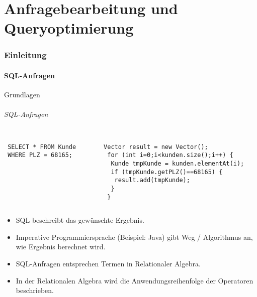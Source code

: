 \part{Anfragebearbeitung und Queryoptimierung}

\section{Einleitung}
\subsection{SQL-Anfragen}

\begin{frame}[fragile]{Grundlagen}
\framesubtitle{SQL-Anfragen}
\begin{columns}
\begin{column}{.3\textwidth}
\begin{lstlisting}
 SELECT * FROM Kunde
 WHERE PLZ = 68165; 
\end{lstlisting}
\end{column}
	
\begin{column}{.58\textwidth}
\lstset{language=Java}
\begin{lstlisting}
 Vector result = new Vector(); 
  for (int i=0;i<kunden.size();i++) {
   Kunde tmpKunde = kunden.elementAt(i);
   if (tmpKunde.getPLZ()==68165) {
    result.add(tmpKunde);
   } 
  }
\end{lstlisting}
\end{column}
\end{columns}
\begin{itemize}
	\item SQL beschreibt das gewünschte Ergebnis. 
	\item Imperative Programmiersprache (Beispiel: Java) gibt Weg / Algorithmus an, wie Ergebnis berechnet wird.
	\item SQL-Anfragen entsprechen Termen in Relationaler Algebra. 
	\item In der Relationalen Algebra wird die Anwendungsreihenfolge der Operatoren beschrieben.
\end{itemize}
\end{frame}

